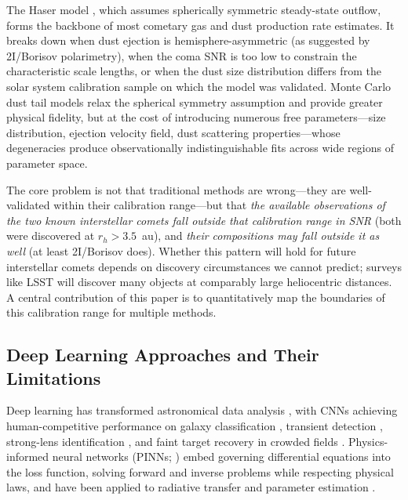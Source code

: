 \documentclass[usenatbib]{mnras}
\begin{document}
The Haser model \citep{haser57}, which assumes spherically symmetric steady-state outflow, forms the backbone of most cometary gas and dust production rate estimates. It breaks down when dust ejection is hemisphere-asymmetric (as suggested by 2I/Borisov polarimetry), when the coma SNR is too low to constrain the characteristic scale lengths, or when the dust size distribution differs from the solar system calibration sample on which the model was validated. Monte Carlo dust tail models \citep{fulle10} relax the spherical symmetry assumption and provide greater physical fidelity, but at the cost of introducing numerous free parameters---size distribution, ejection velocity field, dust scattering properties---whose degeneracies produce observationally indistinguishable fits across wide regions of parameter space.

The core problem is not that traditional methods are wrong---they are well-validated within their calibration range---but that \textit{the available observations of the two known interstellar comets fall outside that calibration range in SNR} (both were discovered at $r_h > 3.5$~au), and \textit{their compositions may fall outside it as well} (at least 2I/Borisov does). Whether this pattern will hold for future interstellar comets depends on discovery circumstances we cannot predict; surveys like LSST will discover many objects at comparably large heliocentric distances. A central contribution of this paper is to quantitatively map the boundaries of this calibration range for multiple methods.

\subsection{Deep Learning Approaches and Their Limitations}

Deep learning has transformed astronomical data analysis \citep{baron19}, with CNNs achieving human-competitive performance on galaxy classification \citep{dieleman15}, transient detection \citep{goldstein15}, strong-lens identification \citep{lanusse18}, and faint target recovery in crowded fields \citep{jiang23}. Physics-informed neural networks (PINNs; \citealt{raissi19}) embed governing differential equations into the loss function, solving forward and inverse problems while respecting physical laws, and have been applied to radiative transfer \citep{mishra21,biswal25} and parameter estimation \citep{lu21}.
\end{document}
